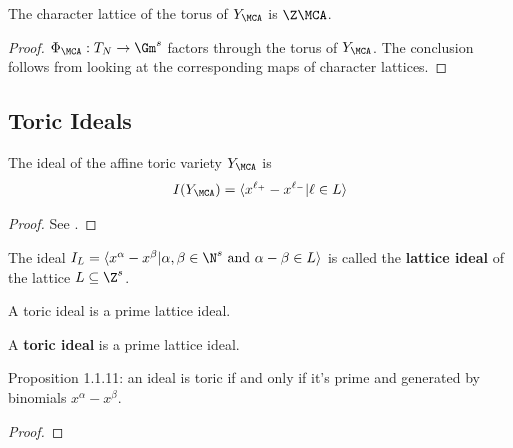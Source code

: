\begin{proposition}
  \label{1-1-8-char-ya}

  The character lattice of the torus of $Y_\MCA$ is $\Z \MCA$.
\end{proposition}
\begin{proof}

  $\Phi_\MCA: T_N \to \Gm^s$ factors through the torus of $Y_\MCA$.
  The conclusion follows from looking at the corresponding maps of character lattices.
\end{proof}

\subsection{Toric Ideals}


\begin{proposition}
  \label{1-1-9-ideal-ya}

  The ideal of the affine toric variety $Y_\MCA$ is
  \[
    I(Y_\MCA) = \langle x^{\ell_+} - x^{\ell_-} | \ell \in L\rangle
  \]
\end{proposition}
\begin{proof}
  \uses{}

  See \cite{Cox_2011}.
\end{proof}


\begin{definition}
  \label{1-1-10-lattice-ideal}
  \uses{}
  \leanok

  The ideal $I_L = \langle x^\alpha - x^\beta | \alpha, \beta \in \N^s \text{ and } \alpha - \beta \in L\rangle$ is called the {\bf lattice ideal} of the lattice $L \subseteq \Z^s$.

  A toric ideal is a prime lattice ideal.
\end{definition}


\begin{definition}
  \label{1-1-10-toric-ideal}
  \leanok
  A {\bf toric ideal} is a prime lattice ideal.
\end{definition}


\begin{proposition}
  \label{1-1-11-toric-ideal-gen-binomial}

  Proposition 1.1.11: an ideal is toric if and only if it's prime and generated by binomials $x^\alpha - x^\beta$.
\end{proposition}
\begin{proof}

\end{proof}


